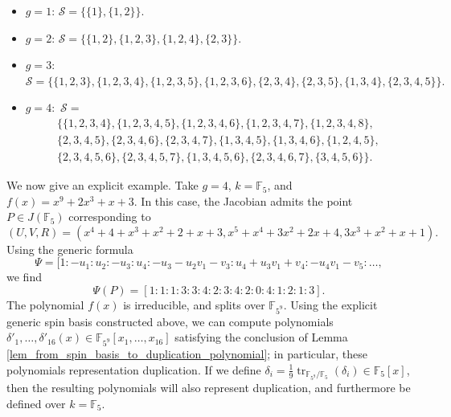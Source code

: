 \documentclass{article} %
\numberwithin{equation}{section}
\DeclareMathOperator{\tr}{tr}
\newcommand{\F}{\mathbb{F}}
\begin{document}
    \begin{itemize}
        \item $g=1$: $\mathcal{S} = \{\{1\},\{1,2\}\}$.
        \item $g=2$: $\mathcal{S} = \{\{1,2\},\{1,2,3\}, \{1,2,4\},\{2,3\}\} $.
        \item $g=3:$ 
        $\mathcal{S} = 
        \{
        \{1,2,3\},
        \{1,2,3,4\}, \{1,2,3,5\}, \{1,2,3,6\},
        \{2,3,4\}, \{2,3,5\}, \{1,3,4\},
        \{2,3,4,5\}
        \}.$
        \item $g = 4:$ $\mathcal{S} = $
        \begin{multline*} \{ \{1,2,3,4\}, \{1,2,3,4,5\},\{1,2,3,4,6\},\{1,2,3,4,7\},\{1,2,3,4,8\},\\ \{2,3,4,5\}, \{2,3,4,6\}, \{2,3,4,7\},\{1,3,4,5\},\{1,3,4,6\},\{1,2,4,5\},\\ \{2,3,4,5,6\},\{2,3,4,5,7\},\{1,3,4,5,6\},\{2,3,4,6,7\},\{3,4,5,6\}\}. 
        \end{multline*}
    \end{itemize}
We now give an explicit example. Take $g = 4$, $k = \F_5$, and $f(x) = x^9 + 2 x^3 + x + 3$. In this case, the Jacobian admits the point $P \in J(\F_5)$ corresponding to 
\[ (U, V, R) = ( x^4 + 4+x^3 + x^2 + 2+x + 3, x^5+x^4+3x^2+2x+4, 3 x^3 + x^2 + x + 1). \]
Using the generic formula
\begin{equation}\label{eqn_generic_psi_in_genus_4} \Psi = [1: -u_1: u_2: -u_3: u_4: -u_3 - u_2 v_1 - v_3: 
u_4 + u_3 v_1 + v_4: -u_4 v_1 - v_5: \dots,
 \end{equation}
 we
 find 
 \[ \Psi(P) = [ 1: 1: 1: 3: 3: 4: 2: 3: 4: 2: 0: 4: 1: 2: 1: 3 ]. \]
The polynomial $f(x)$ is irreducible, and splits over $\F_{5^9}$. Using the explicit generic spin basis constructed above, we can compute polynomials $\delta'_1, \dots, \delta'_{16}(x) \in \F_{5^9}[x_1, \dots, x_{16}]$ satisfying the conclusion of Lemma \ref{lem_from_spin_basis_to_duplication_polynomial}; in particular, these polynomials representation duplication. If we define $\delta_i = \frac{1}{9} \tr_{\F_{5^9} / \F_5}(\delta_i) \in \F_5[x]$, then the resulting polynomials will also represent duplication, and furthermore be defined over $k = \F_5$.
\end{document}
